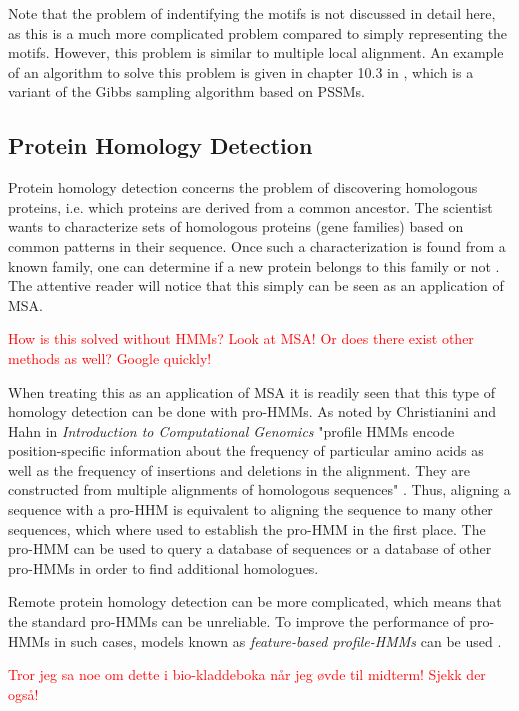 \documentclass{article}\usepackage[]{graphicx}\usepackage[]{color}
\begin{document}
Note that the problem of indentifying the motifs is not discussed in detail here, as this is a much more complicated problem compared to simply representing the motifs. However, this problem is similar to multiple local alignment. An example of an algorithm to solve this problem is given in chapter 10.3 in \cite{Christianini2006}, which is a variant of the Gibbs sampling algorithm based on PSSMs. 

\subsection{Protein Homology Detection}\label{Section:ProtHomoDetect}
Protein homology detection concerns the problem of discovering homologous proteins, i.e. which proteins are derived from a common ancestor. The scientist wants to characterize sets of homologous proteins (gene families) based on common patterns in their sequence. Once such a characterization is found from a known family, one can determine if a new protein belongs to this family or not \cite{Christianini2006}. The attentive reader will notice that this simply can be seen as an application of MSA. 

\textcolor{red}{How is this solved without HMMs? Look at MSA! Or does there exist other methods as well? Google quickly!}

When treating this as an application of MSA it is readily seen that this type of homology detection can be done with pro-HMMs. As noted by Christianini and Hahn in \textit{Introduction to Computational Genomics} "proﬁle HMMs encode position-speciﬁc information about the frequency of particular amino acids as well as the frequency of insertions and deletions in the alignment. They are constructed from multiple alignments
of homologous sequences" \cite{Christianini2006}. Thus, aligning a sequence with a pro-HHM is equivalent to aligning the sequence to many other sequences, which where used to establish the pro-HMM in the first place. The pro-HMM can be used to query a database of sequences or a database of other pro-HMMs in order to find additional homologues. 

Remote protein homology detection can be more complicated, which means that the standard pro-HMMs can be unreliable. To improve the performance of pro-HMMs in such cases, models known as \textit{feature-based profile-HMMs} can be used \cite{Yoon2009}.

\textcolor{red}{Tror jeg sa noe om dette i bio-kladdeboka når jeg øvde til midterm! Sjekk der også!}
\end{document}
